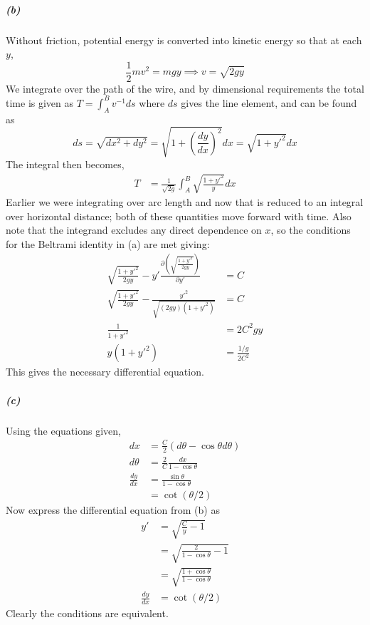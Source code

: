 \documentclass[12pt]{scrartcl}
\begin{document}
\subparagraph{(b)}
Without friction, potential energy is converted into kinetic energy so that at each $y$, 
\[\frac{1}{2}m v^2 = m g y\implies v = \sqrt{2 g y}\]
We integrate over the path of the wire, and by dimensional requirements the total time is given as $T = \int_{A}^{B} v^{-1} ds$ where $ds$ gives the line element, and can be found as
\[ds = \sqrt{dx^2+dy^2} = \sqrt{1 + \left(\frac{dy}{dx}\right)^2}dx=\sqrt{1 + y'^2}dx\]
The integral then becomes,
\begin{align*}
	T &= \frac{1}{\sqrt{2g}}\int_{A}^{B}\sqrt{\frac{1+y'^2}{y}} dx
\end{align*}
Earlier we were integrating over arc length and now that is reduced to an integral over horizontal distance; both of these quantities move forward with time. Also note that the integrand excludes any direct dependence on $x$, so the conditions for the Beltrami identity in (a) are met giving:
\begin{align*}
	\sqrt{\frac{1+y'^2}{2g y}} - y'\frac{\partial\left(\sqrt{\frac{1+y'^2}{2g y}}\right)}{\partial y'} &= C\\
	\sqrt{\frac{1+y'^2}{2g y}}- \frac{y'^2}{\sqrt{(2 g y)(1 + y'^2)}} &= C \\
	\frac{1}{1+ y'^2} &= 2C^2 g y \\
	y (1 + y'^2) &= \frac{1/g}{2C^2}
\end{align*}
This gives the necessary differential equation.
\subparagraph{(c)} Using the equations given,
\begin{align*}
	dx &= \frac{C}{2}(d\theta - \cos{\theta}d\theta)\\
	d\theta &= \frac{2}{C}\frac{dx}{1 - \cos{\theta}}\\
	\frac{dy}{dx} &= \frac{\sin{\theta}}{1-\cos{\theta}}\\
	&=\cot{(\theta/2)}
\end{align*}
Now express the differential equation from (b) as
\begin{align*}
y' &= \sqrt{\frac{C}{y}-1} \\
&= \sqrt{\frac{2}{1-\cos{\theta}}-1}\\
&=\sqrt{\frac{1+\cos{\theta}}{1-\cos{\theta}}}\\
\frac{dy}{dx}&=\cot{(\theta/2)}
\end{align*}
Clearly the conditions are equivalent.
\end{document}
